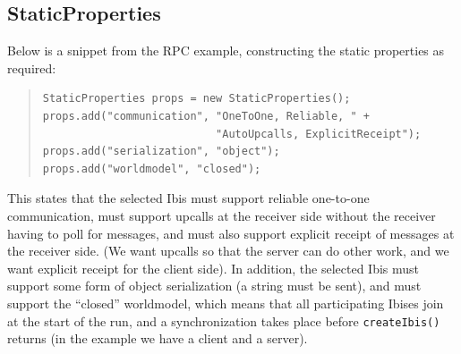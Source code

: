 \documentclass[10pt]{article}
\newcommand{\mysubsection}[1]{\subsection{#1}\label{#1}}
\begin{document}
\mysubsection{StaticProperties}

Below is a snippet from the RPC example, constructing the static
properties as required:
{\small
\begin{quote}
\begin{verbatim}
StaticProperties props = new StaticProperties();
props.add("communication", "OneToOne, Reliable, " + 
                           "AutoUpcalls, ExplicitReceipt");
props.add("serialization", "object");
props.add("worldmodel", "closed");
\end{verbatim}
\end{quote}
}
This states that the selected Ibis must support reliable one-to-one
communication, must support upcalls at the receiver side without the
receiver having to poll for messages, and must also support explicit
receipt of messages at the receiver side.
(We want upcalls so that the server can do other work, and we want
explicit receipt for the client side).
In addition, the selected Ibis must support some form of object
serialization (a string must be sent),
and must support the ``closed'' worldmodel, which means
that all participating Ibises join at the start of the run, and a
synchronization takes place before \texttt{createIbis()} returns
(in the example we have a client and a server).
\end{document}
